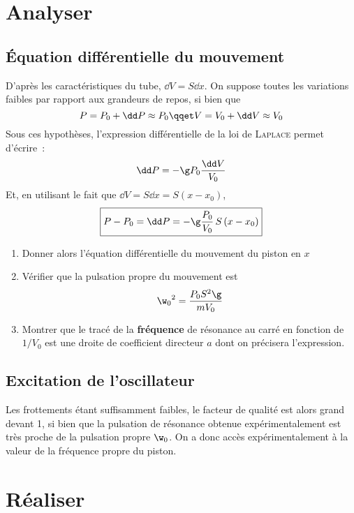 \documentclass[a4paper, 11pt, final, garamond]{book}
\begin{document}
\section{Analyser}
\subsection{Équation différentielle du mouvement}

D'après les caractéristiques du tube, $\dd V=S \dd x$. On suppose toutes les
variations faibles par rapport aux grandeurs de repos, si bien que
\[
    P = P_0 +\dd P \approx P_0 \qqet V = V_0 +\dd V \approx V_0
\]
Sous ces hypothèses, l'expression différentielle de la loi de \textsc{Laplace}
permet d'écrire~:
\[
    \dd P = -\g P_0 \frac{\dd V}{V_0}
\]
Et, en utilisant le fait que $\dd V = S \dd x = S (x-x_0)$,
\[
    \boxed{P-P_0 = \dd P = - \g \frac{P_0}{V_0} \, S \, (x-x_0)}
\]

\begin{enumerate}[label=\clenumi]
    \item Donner alors l'équation différentielle du mouvement du piston en $x$
    \item Vérifier que la pulsation propre du mouvement est
        \[
            {\w_0}^2 = \frac{P_0S^2\g}{mV_0}
        \]
    \item Montrer que le tracé de la \textbf{fréquence} de résonance au carré en
        fonction de $1/V_0$ est une droite de coefficient directeur $a$ dont on
        précisera l'expression.
\end{enumerate}

\subsection{Excitation de l'oscillateur}

Les frottements étant suffisamment faibles, le facteur de qualité est alors
grand devant 1, si bien que la pulsation de résonance obtenue expérimentalement
est très proche de la pulsation propre $\w_0$. On a donc accès expérimentalement
à la valeur de la fréquence propre du piston.

\section{Réaliser}
\end{document}
